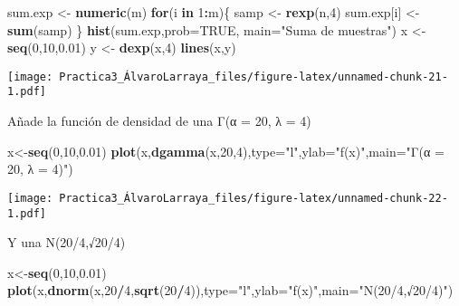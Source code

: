 \documentclass[
]{article}
\newenvironment{Shaded}{\begin{snugshade}}{\end{snugshade}}
\newcommand{\ControlFlowTok}[1]{\textcolor[rgb]{0.13,0.29,0.53}{\textbf{#1}}}
\newcommand{\DataTypeTok}[1]{\textcolor[rgb]{0.13,0.29,0.53}{#1}}
\newcommand{\DecValTok}[1]{\textcolor[rgb]{0.00,0.00,0.81}{#1}}
\newcommand{\FloatTok}[1]{\textcolor[rgb]{0.00,0.00,0.81}{#1}}
\newcommand{\KeywordTok}[1]{\textcolor[rgb]{0.13,0.29,0.53}{\textbf{#1}}}
\newcommand{\NormalTok}[1]{#1}
\newcommand{\OperatorTok}[1]{\textcolor[rgb]{0.81,0.36,0.00}{\textbf{#1}}}
\newcommand{\OtherTok}[1]{\textcolor[rgb]{0.56,0.35,0.01}{#1}}
\newcommand{\StringTok}[1]{\textcolor[rgb]{0.31,0.60,0.02}{#1}}
\begin{document}
\begin{Shaded}
\begin{Highlighting}[]
\NormalTok{sum.exp <-}\StringTok{ }\KeywordTok{numeric}\NormalTok{(m)}
\ControlFlowTok{for}\NormalTok{(i }\ControlFlowTok{in} \DecValTok{1}\OperatorTok{:}\NormalTok{m)\{}
\NormalTok{samp <-}\StringTok{ }\KeywordTok{rexp}\NormalTok{(n,}\DecValTok{4}\NormalTok{)}
\NormalTok{sum.exp[i] <-}\StringTok{ }\KeywordTok{sum}\NormalTok{(samp)}
\NormalTok{\}}
\KeywordTok{hist}\NormalTok{(sum.exp,}\DataTypeTok{prob=}\OtherTok{TRUE}\NormalTok{, }\DataTypeTok{main=}\StringTok{"Suma de muestras"}\NormalTok{)}
\NormalTok{x <-}\StringTok{ }\KeywordTok{seq}\NormalTok{(}\DecValTok{0}\NormalTok{,}\DecValTok{10}\NormalTok{,}\FloatTok{0.01}\NormalTok{)}
\NormalTok{y <-}\StringTok{ }\KeywordTok{dexp}\NormalTok{(x,}\DecValTok{4}\NormalTok{)}
\KeywordTok{lines}\NormalTok{(x,y)}
\end{Highlighting}
\end{Shaded}

\texttt{[image: Practica3\_ÁlvaroLarraya\_files/figure-latex/unnamed-chunk-21-1.pdf]}

Añade la función de densidad de una Γ(α = 20, λ = 4)

\begin{Shaded}
\begin{Highlighting}[]
\NormalTok{x<-}\KeywordTok{seq}\NormalTok{(}\DecValTok{0}\NormalTok{,}\DecValTok{10}\NormalTok{,}\FloatTok{0.01}\NormalTok{)}
\KeywordTok{plot}\NormalTok{(x,}\KeywordTok{dgamma}\NormalTok{(x,}\DecValTok{20}\NormalTok{,}\DecValTok{4}\NormalTok{),}\DataTypeTok{type=}\StringTok{"l"}\NormalTok{,}\DataTypeTok{ylab=}\StringTok{"f(x)"}\NormalTok{,}\DataTypeTok{main=}\StringTok{"Γ(α = 20, λ = 4)"}\NormalTok{)}
\end{Highlighting}
\end{Shaded}

\texttt{[image: Practica3\_ÁlvaroLarraya\_files/figure-latex/unnamed-chunk-22-1.pdf]}

Y una N(20/4,√20/4)

\begin{Shaded}
\begin{Highlighting}[]
\NormalTok{x<-}\KeywordTok{seq}\NormalTok{(}\DecValTok{0}\NormalTok{,}\DecValTok{10}\NormalTok{,}\FloatTok{0.01}\NormalTok{)}
\KeywordTok{plot}\NormalTok{(x,}\KeywordTok{dnorm}\NormalTok{(x,}\DecValTok{20}\OperatorTok{/}\DecValTok{4}\NormalTok{,}\KeywordTok{sqrt}\NormalTok{(}\DecValTok{20}\OperatorTok{/}\DecValTok{4}\NormalTok{)),}\DataTypeTok{type=}\StringTok{"l"}\NormalTok{,}\DataTypeTok{ylab=}\StringTok{"f(x)"}\NormalTok{,}\DataTypeTok{main=}\StringTok{"N(20/4,√20/4)"}\NormalTok{)}
\end{Highlighting}
\end{Shaded}
\end{document}
